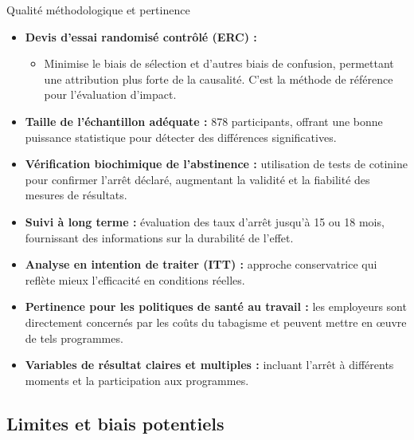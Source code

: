 \documentclass[aspectratio=169,xcolor=dvipsnames]{beamer}
\begin{document}
\begin{frame}{Qualité méthodologique et pertinence}
    \begin{itemize}
        \item \textbf{Devis d'essai randomisé contrôlé (ERC) :}
            \begin{itemize}
                \item Minimise le biais de sélection et d'autres biais de confusion, permettant une attribution plus forte de la causalité. C'est la méthode de référence pour l'évaluation d'impact.
            \end{itemize}
        \item \textbf{Taille de l'échantillon adéquate :} 878 participants, offrant une bonne puissance statistique pour détecter des différences significatives.
        \item \textbf{Vérification biochimique de l'abstinence :} utilisation de tests de cotinine pour confirmer l'arrêt déclaré, augmentant la validité et la fiabilité des mesures de résultats.
        \item \textbf{Suivi à long terme :} évaluation des taux d'arrêt jusqu'à 15 ou 18 mois, fournissant des informations sur la durabilité de l'effet.
        \item \textbf{Analyse en intention de traiter (ITT) :} approche conservatrice qui reflète mieux l'efficacité en conditions réelles.
        \item \textbf{Pertinence pour les politiques de santé au travail :} les employeurs sont directement concernés par les coûts du tabagisme et peuvent mettre en œuvre de tels programmes.
        \item \textbf{Variables de résultat claires et multiples :} incluant l'arrêt à différents moments et la participation aux programmes.
    \end{itemize}
\end{frame}

\subsection{Limites et biais potentiels}
\end{document}
